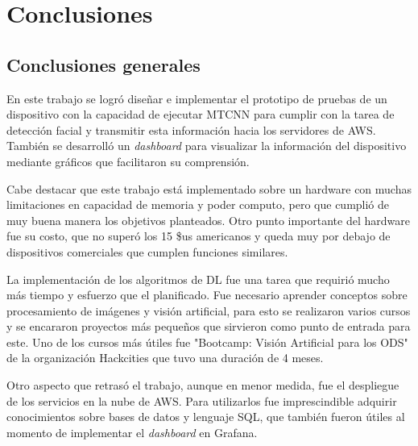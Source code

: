 
\chapter{Conclusiones} %

\label{Chapter5} %




\section{Conclusiones generales }
En este trabajo se logró diseñar e implementar el prototipo de pruebas de un dispositivo con la capacidad de ejecutar MTCNN para cumplir con la tarea de detección facial y transmitir esta información hacia los servidores de AWS. También se desarrolló un \textit{dashboard} para visualizar la información del dispositivo mediante gráficos que facilitaron su comprensión.


Cabe destacar que este trabajo está implementado sobre un hardware con muchas limitaciones en capacidad de memoria y poder computo, pero que cumplió de muy buena manera los objetivos planteados. Otro punto importante del hardware fue su costo, que no superó los 15 \$us americanos y queda muy por debajo de dispositivos comerciales que cumplen funciones similares.


La implementación de los algoritmos de DL fue una tarea que requirió mucho más tiempo y esfuerzo que el planificado. Fue necesario aprender conceptos sobre procesamiento de imágenes y visión artificial, para esto se realizaron varios cursos y se encararon proyectos más pequeños que sirvieron como punto de entrada para este. Uno de los cursos más útiles fue "Bootcamp: Visión Artificial para los ODS" de la organización Hackcities que tuvo una duración de 4 meses.


Otro aspecto que retrasó el trabajo, aunque en menor medida, fue el despliegue de los servicios en la nube de AWS. Para utilizarlos fue imprescindible adquirir conocimientos sobre bases de datos y lenguaje SQL, que también fueron útiles al momento de implementar el \textit{dashboard} en Grafana.


